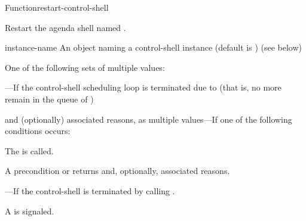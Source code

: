 \documentclass[10pt,twoside,english,pdftex]{article}
\begin{document}

\begin{functiondoc}{Function}{restart-control-shell}{%
     
    \returns{} \superstar}
%
%
%

\fnsyntax

\fnpurpose Restart the agenda shell named .

\fnpackage {}

\fnmodule {}

%
\fnargs
\begin{args}{instance-name}
 An object naming a control-shell instance (default is 
) 
\arg[results] (see below)
\end{args}

\fnreturns
One of the following sets of multiple values: 
\begin{tightitemize}
\item {}---If the control-shell scheduling loop is terminated
  due to  (that is, no more  remain 
  in the queue of ) 
\item {} and (optionally) associated reasons, as multiple
  values---If one of the following conditions occurs:
\begin{tightitemize}
\item The   is
  called.
\item A precondition  or  
  returns  and, optionally, associated reasons.
\end{tightitemize}
\item {}---If the control-shell is terminated by
  calling .
\end{tightitemize}

\fnevents
{}%
%
%
%
%
%
A  is signaled.
 

\end{functiondoc}
\end{document}
